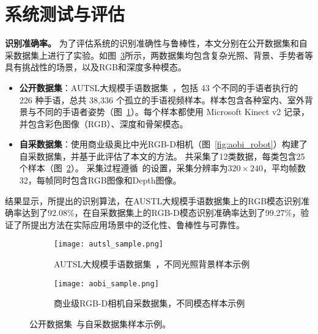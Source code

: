 \section{系统测试与评估}
\textbf{识别准确率。}
为了评估系统的识别准确性与鲁棒性，本文分别在公开数据集和自采数据集上进行了实验。如图~\ref{fig:dataset_sample}所示，两数据集均包含复杂光照、背景、手势者等具有挑战性的场景，以及RGB和深度多种模态。
\begin{itemize}
    \item \textbf{公开数据集}：AUTSL大规模手语数据集~\cite{sincan2020autsl}，包括 43 个不同的手语者执行的 226 种手语，总共 38,336 个孤立的手语视频样本。样本包含各种室内、室外背景与不同的手语者姿势（图~\ref{fig:autsl_sample}）。每个样本都使用 Microsoft Kinect v2 记录，并包含彩色图像（RGB）、深度和骨架模态。
    \item \textbf{自采数据集}：使用商业级奥比中光RGB-D相机（图~\ref{fig:aobi_robot}）构建了自采数据集，并基于此评估了本文的方法。%
    共采集了12类数据，每类包含25个样本（图~\ref{fig:aobi_sample}）。%
    采集过程遵循~\cite{wan2016chalearn}的设置，采集分辨率为$320\times240$，平均帧数32，每帧同时包含RGB图像和Depth图像。
\end{itemize}
结果显示，所提出的识别算法，在AUSTL大规模手语数据集上的RGB模态识别准确率达到了92.08\%，在自采数据集上的RGB-D模态识别准确率达到了99.27\%，验证了所提出方法在实际应用场景中的泛化性、鲁棒性与可靠性。
\begin{figure}
    \centering
    \begin{subfigure}[b]{\linewidth}
      \centering
      \texttt{[image: autsl\_sample.png]}
      \caption{AUTSL大规模手语数据集~\cite{sincan2020autsl}，不同光照背景样本示例\label{fig:autsl_sample}}
    \end{subfigure}
    \begin{subfigure}[b]{\linewidth}
      \centering
      \texttt{[image: aobi\_sample.png]}
      \caption{商业级RGB-D相机自采数据集，不同模态样本示例\label{fig:aobi_sample}}
    \end{subfigure}
    \caption{公开数据集~\cite{sincan2020autsl}与自采数据集样本示例。}
    \label{fig:dataset_sample}
  \end{figure}

